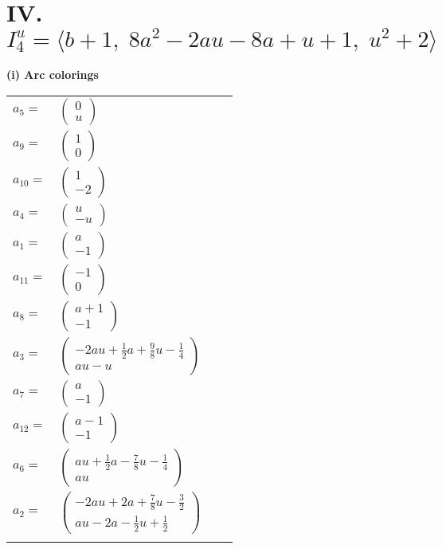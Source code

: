\documentclass[1p]{elsarticle_modified}
\theoremstyle{definition}
\begin{document}
\centering \section*{IV. $I^u_{4}= \langle b+1,\;8 a^2-2 a u-8 a+u+1,\;u^2+2 \rangle$}
\flushleft \textbf{(i) Arc colorings}\\
\begin{tabular}{m{7pt} m{180pt} m{7pt} m{180pt} }
\flushright $a_{5}=$&$\begin{pmatrix}0\\u\end{pmatrix}$ \\
\flushright $a_{9}=$&$\begin{pmatrix}1\\0\end{pmatrix}$ \\
\flushright $a_{10}=$&$\begin{pmatrix}1\\-2\end{pmatrix}$ \\
\flushright $a_{4}=$&$\begin{pmatrix}u\\- u\end{pmatrix}$ \\
\flushright $a_{1}=$&$\begin{pmatrix}a\\-1\end{pmatrix}$ \\
\flushright $a_{11}=$&$\begin{pmatrix}-1\\0\end{pmatrix}$ \\
\flushright $a_{8}=$&$\begin{pmatrix}a+1\\-1\end{pmatrix}$ \\
\flushright $a_{3}=$&$\begin{pmatrix}-2 a u+\frac{1}{2} a+\frac{9}{8} u-\frac{1}{4}\\a u- u\end{pmatrix}$ \\
\flushright $a_{7}=$&$\begin{pmatrix}a\\-1\end{pmatrix}$ \\
\flushright $a_{12}=$&$\begin{pmatrix}a-1\\-1\end{pmatrix}$ \\
\flushright $a_{6}=$&$\begin{pmatrix}a u+\frac{1}{2} a-\frac{7}{8} u-\frac{1}{4}\\a u\end{pmatrix}$ \\
\flushright $a_{2}=$&$\begin{pmatrix}-2 a u+2 a+\frac{7}{8} u-\frac{3}{2}\\a u-2 a-\frac{1}{2} u+\frac{1}{2}\end{pmatrix}$\\&\end{tabular}
\end{document}

